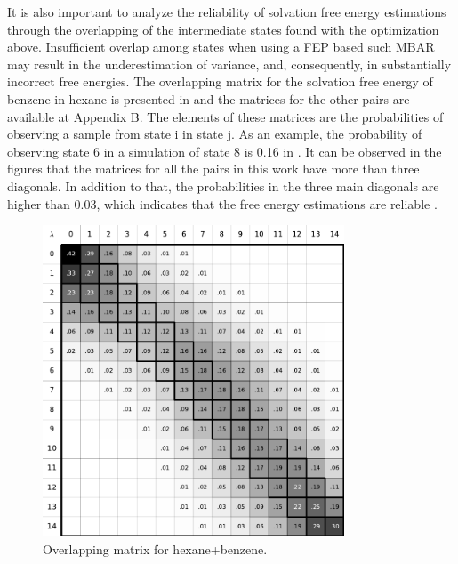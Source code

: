 It is also important to analyze the reliability of solvation free energy estimations  through the overlapping of the intermediate states found with the optimization above. Insufficient overlap among states when using a FEP based such MBAR may result in the underestimation of variance, and, consequently, in substantially incorrect free energies. The overlapping matrix for the solvation free energy of benzene in hexane is presented in  and the matrices for the other pairs are available at Appendix B. The elements of these matrices are the probabilities of observing a sample from state  i in state j. As an example, the probability of observing state 6 in a simulation of state 8 is 0.16 in . It can be observed in the figures that  the matrices for all the pairs in this work have more than  three diagonals. In addition to that,  the probabilities in the three main diagonals are higher than 0.03, which indicates that the free energy estimations are reliable \cite{klimovich}.   

\begin{figure}[H]
	\centering
	\includegraphics[width=0.8\textwidth]{Figures/ohex_benz}
	\caption{Overlapping matrix for hexane+benzene.}
    \label{fig:hexove}
\end{figure}

